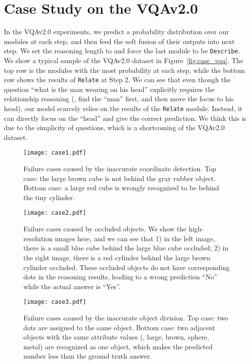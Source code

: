 \documentclass[10pt,twocolumn,letterpaper]{article}
\begin{document}
\section{Case Study on the VQAv2.0}
In the VQAv2.0 experiments, we predict a probability distribution over our modules at each step, and then feed the soft fusion of their outputs into next step.
We set the reasoning length to  and force the last module to be \texttt{Describe}.
We show a typical sample of the VQAv2.0 dataset in Figure~\ref{fig:case_vqa}.
The top row is the modules with the most probability at each step, while the bottom row shows the results of \texttt{Relate} at Step 2.
We can see that even though the question ``what is the man wearing on his head'' explicitly requires the relationship reasoning (\ie, find the ``man'' first, and then move the focus to his head), our model scarcely relies on the results of the \texttt{Relate} module.
Instead, it can directly focus on the ``head'' and give the correct prediction.
We think this is due to the simplicity of questions, which is a shortcoming of the VQAv2.0 dataset.




\begin{figure*}[ht]
    \centering
    \texttt{[image: case1.pdf]}
    \caption{Failure cases caused by the inaccurate coordinate detection. Top case: the large brown cube is not behind the gray rubber object. Bottom case: a large red cube is wrongly recognized to be behind the tiny cylinder.}
    \label{fig:case1}
\end{figure*}

\begin{figure*}[ht]
    \centering
    \texttt{[image: case2.pdf]}
    \caption{Failure cases caused by occluded objects. We show the high-resolution images here, and we can see that 1) in the left image, there is a small blue cube behind the large blue cube occluded; 2) in the right image, there is a red cylinder behind the large brown cylinder occluded. These occluded objects do not have corresponding dots in the reasoning results, leading to a wrong prediction ``No'' while the actual answer is ``Yes''.}
    \label{fig:case2}
\end{figure*}

\begin{figure*}[ht]
    \centering
    \texttt{[image: case3.pdf]}
    \caption{Failure cases caused by the inaccurate object division. Top case: two dots are assigned to the same object. Bottom case: two adjacent objects with the same attribute values (\ie, large, brown, sphere, metal) are recognized as one object, which makes the predicted number less than the ground truth answer.}
    \label{fig:case3}
\end{figure*}
\end{document}
